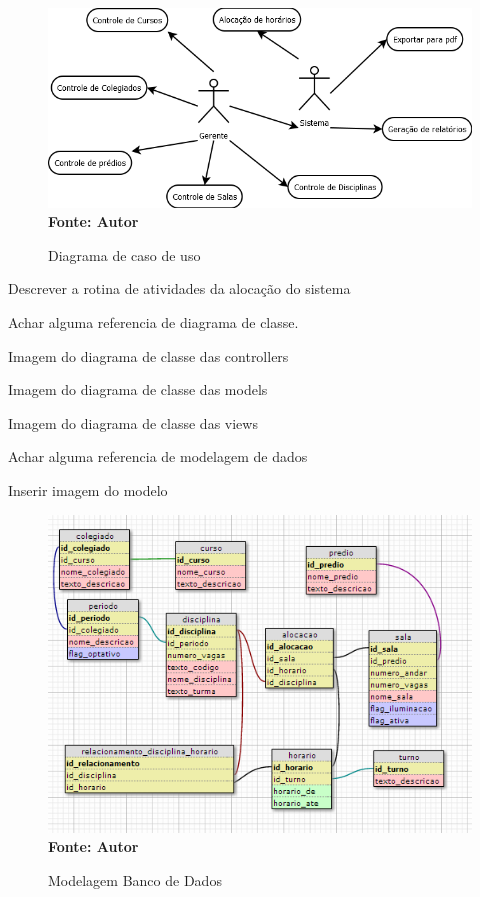 	\begin{figure}[!htb]
		\centering
   		\caption[Diagrama de caso de uso]{Diagrama de caso de uso}
   		\label{fig:figura2}
   		\centering
   		\includegraphics[scale=0.5]{diagramaCasoUso.png}
   		\\ \textbf{\footnotesize Fonte: Autor}
	\end{figure}


	
	Descrever a rotina de atividades da alocação do sistema
	

		
	Achar alguma referencia de diagrama de classe.

	Imagem do diagrama de classe das controllers

	
	Imagem do diagrama de classe das models

	
	Imagem do diagrama de classe das views


	Achar alguma referencia de modelagem de dados

	Inserir imagem do modelo

		\begin{figure}[!htb]
   		\caption[Modelagem Banco de Dados]{Modelagem Banco de Dados}
   		\label{fig:figura3}
   		\centering
   		\includegraphics{modelagemBanco.png}
   		\\ \textbf{\footnotesize Fonte: Autor}
	\end{figure}

